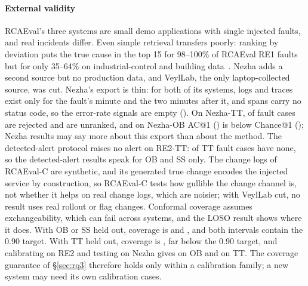 \paragraph{External validity}
RCAEval's three systems are small demo applications with single injected faults, and real incidents differ.
Even simple retrieval transfers poorly: ranking by deviation puts the true cause in the top 15 for 98--100\% of RCAEval RE1 faults but for only 35--64\% on industrial-control and building data~\cite{decomprca2026}.
Nezha adds a second source but no production data, and VeylLab, the only laptop-collected source, was cut.
Nezha's export is thin: for both of its systems, logs and traces exist only for the fault's minute and the two minutes after it, and spans carry no status code, so the error-rate signals are empty (\allowbreak{}).
On Nezha-TT,  of  fault cases are rejected and  are unranked, and on Nezha-OB AC@1 () is below Chance@1 (); Nezha results may say more about this export than about the method.
The detected-alert protocol raises no alert on RE2-TT:  of  TT fault cases have none, so the detected-alert results speak for OB and SS only.
The change logs of RCAEval-C are synthetic, and its generated true change encodes the injected service by construction, so RCAEval-C tests how gullible the change channel is, not whether it helps on real change logs, which are noisier; with VeylLab cut, no result uses real rollout or flag changes.
Conformal coverage assumes exchangeability, which can fail across systems, and the LOSO result shows where it does.
With OB or SS held out, coverage is   and  , and both intervals contain the 0.90 target.
With TT held out, coverage is  , far below the 0.90 target, and calibrating on RE2 and testing on Nezha gives  on OB and  on TT.
The coverage guarantee of \S\ref{sec:rq3} therefore holds only within a calibration family; a new system may need its own calibration cases.

